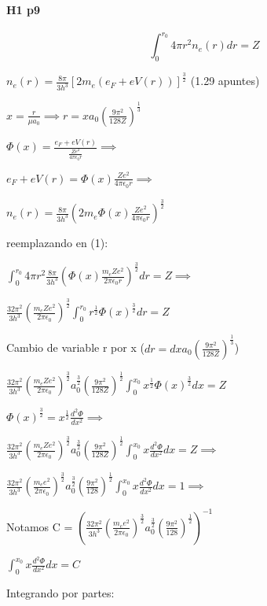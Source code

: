 \documentclass[12pt]{book}
\begin{document}
\paragraph{H1 p9}
\begin{equation}
\int_0^{r_0}{4\pi r^2 n_e(r) dr } = Z
\end{equation}


$n_e(r) = \frac{8 \pi}{3 h^3} [2 m_e (e_F + e V(r))]^{\frac{3}{2}}$  (1.29 apuntes)

$x = \frac{r}{\mu a_0} \implies r = x a_0 (\frac{9 \pi^2}{128 Z})^{\frac{1}{3}}$

$\Phi(x) = \frac{e_F + e V(r)}{\frac{Z e^2}{4 \pi \epsilon_0 r}} \implies $

$e_F + e V(r) = \Phi(x) \frac{Z e^2}{4 \pi \epsilon_0 r} \implies $

$n_e(r) = \frac{8 \pi}{3 h^3} (2 m_e \Phi(x) \frac{Z e^2}{4 \pi \epsilon_0 r} )^{\frac{3}{2}}$ 

reemplazando en (1):

$\int_0^{r_0}{4\pi r^2  \frac{8 \pi}{3 h^3} (\Phi(x) \frac{m_e Z e^2}{2 \pi \epsilon_0 r} )^{\frac{3}{2}}dr } = Z \implies$

$\frac{32 \pi^2}{3 h^3} (\frac{m_e Z e^2}{2 \pi \epsilon_0})^{\frac{3}{2}} \int_0^{r_0}{r^{\frac{1}{2}} \Phi(x)^{\frac{3}{2}} dr } = Z$

Cambio de variable r por x ($dr = dx a_0 (\frac{9 \pi^2}{128 Z})^{\frac{1}{3}}$)


$\frac{32 \pi^2}{3 h^3} (\frac{m_e Z e^2}{2 \pi \epsilon_0})^{\frac{3}{2}} a_0^{\frac{3}{2}}  (\frac{9 \pi^2}{128 Z})^{\frac{1}{2}}\int_0^{x_0}{x^{\frac{1}{2}} \Phi(x)^{\frac{3}{2}} dx } = Z $

$\Phi(x)^{\frac{3}{2}} = x^{\frac{1}{2}} \frac{d^2\Phi}{dx^2} \implies$

$\frac{32 \pi^2}{3 h^3} (\frac{m_e Z e^2}{2 \pi \epsilon_0})^{\frac{3}{2}} a_0^{\frac{3}{2}}  (\frac{9 \pi^2}{128 Z})^{\frac{1}{2}}\int_0^{x_0}{x \frac{d^2\Phi}{dx^2} dx } = Z \implies$


$\frac{32 \pi^2}{3 h^3} (\frac{m_e  e^2}{2 \pi \epsilon_0})^{\frac{3}{2}} a_0^{\frac{3}{2}}  (\frac{9 \pi^2}{128 })^{\frac{1}{2}}\int_0^{x_0}{x \frac{d^2\Phi}{dx^2} dx } = 1 \implies$

Notamos C = $(\frac{32 \pi^2}{3 h^3} (\frac{m_e  e^2}{2 \pi \epsilon_0})^{\frac{3}{2}} a_0^{\frac{3}{2}}  (\frac{9 \pi^2}{128 })^{\frac{1}{2}})^{-1} $

$\int_0^{x_0}{x \frac{d^2\Phi}{dx^2} dx } = C $

Integrando por partes:
\end{document}
